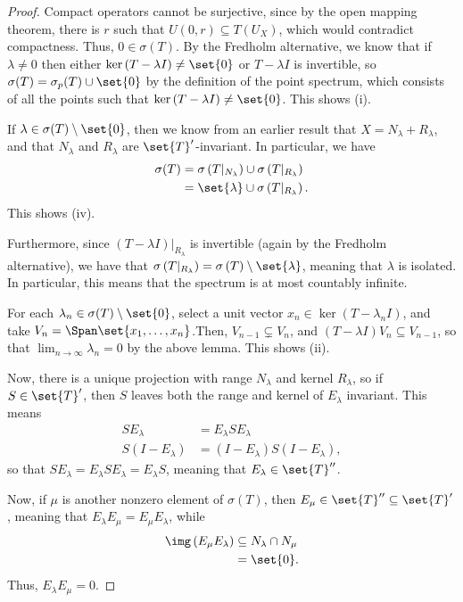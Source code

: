 \documentclass[10pt]{mypackage}
\begin{document}
\begin{proof}
  Compact operators cannot be surjective, since by the open mapping theorem, there is $r$ such that $U(0,r)\subseteq T\left(U_X\right)$, which would contradict compactness. Thus, $0\in \sigma(T)$. By the Fredholm alternative, we know that if $\lambda\neq 0$ then either $\ker\left( T-\lambda I \right)\neq \set{0}$ or $T-\lambda I$ is invertible, so $\sigma(T) = \sigma_p(T)\cup \set{0}$ by the definition of the point spectrum, which consists of all the points such that $\ker\left( T-\lambda I \right)\neq \set{0}$. This shows (i).

  If $\lambda\in \sigma(T)\setminus \set{0}$, then we know from an earlier result that $X = N_{\lambda} + R_{\lambda}$, and that $N_{\lambda}$ and $R_{\lambda}$ are $\set{T}'$-invariant. In particular, we have
    \begin{align*}
      \sigma(T) &= \sigma\left( T|_{N_{\lambda}} \right)\cup \sigma\left( T|_{R_{\lambda}} \right)\\
                &= \set{\lambda}\cup \sigma\left( T|_{R_{\lambda}} \right). 
    \end{align*}
    This shows (iv).

    Furthermore, since $\left( T-\lambda I \right)|_{R_{\lambda}}$ is invertible (again by the Fredholm alternative), we have that $\sigma\left( T|_{R_{\lambda}} \right) = \sigma\left( T \right)\setminus \set{\lambda}$, meaning that $\lambda$ is isolated. In particular, this means that the spectrum is at most countably infinite.

    For each $\lambda_n\in \sigma(T)\setminus \set{0}$, select a unit vector $x_n\in \ker\left( T-\lambda_n I \right)$, and take $V_n = \Span\set{x_1,\dots,x_n}$.Then, $V_{n-1}\subsetneq V_n$, and $\left( T-\lambda I \right) V_n\subseteq V_{n-1}$, so that $\lim_{n\rightarrow\infty}\lambda_n = 0$ by the above lemma. This shows (ii).

    Now, there is a unique projection with range $N_{\lambda}$ and kernel $R_{\lambda}$, so if $S\in \set{T}'$, then $S$ leaves both the range and kernel of $E_{\lambda}$ invariant. This means
    \begin{align*}
      SE_{\lambda} &= E_{\lambda}S E_{\lambda}\\
      S\left( I-E_{\lambda} \right) &= \left( I-E_{\lambda} \right)S\left( I-E_{\lambda} \right),
    \end{align*}
    so that $SE_{\lambda} = E_{\lambda}SE_{\lambda} = E_{\lambda}S$, meaning that $E_{\lambda}\in \set{T}''$.

    Now, if $\mu$ is another nonzero element of $\sigma(T)$, then $E_{\mu}\in \set{T}''\subseteq \set{T}'$, meaning that $E_{\lambda}E_{\mu} = E_{\mu}E_{\lambda}$, while
    \begin{align*}
      \img\left( E_{\mu}E_{\lambda} \right) &\subseteq N_{\lambda}\cap N_{\mu}\\
                                            &= \set{0}.
    \end{align*}
    Thus, $E_{\lambda}E_{\mu} = 0$.
\end{proof}
\nocite{murphy_cstar_algebras_and_operator_theory,davidson_functional_analysis}
\printbibliography
\end{document}
